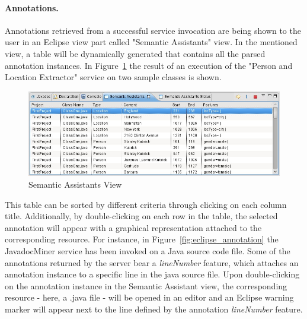 \paragraph{Annotations.}
Annotations retrieved from a successful service invocation are being shown to the user in an
Eclipse view part called "Semantic Assistants" view. In the mentioned view, a
table will be dynamically generated that contains
all the parsed annotation instances. In Figure~\ref{fig:eclipse_saView} the
result of an execution of the "Person and Location Extractor" service on two
sample classes is shown.
\begin{figure}[htb]
\begin{center}
  \includegraphics[width=1\textwidth]{pictures/eclipse_saView.jpg}
  \caption{Semantic Assistants View}
  \label{fig:eclipse_saView}
\end{center}
\end{figure}

This table can be sorted by different criteria through clicking on each column
title. Additionally, by double-clicking on each row in the table, the selected
annotation will appear with a graphical representation attached to the
corresponding resource. For instance, in Figure~\ref{fig:eclipse_annotation} the
JavadocMiner service has been invoked on a Java source code file. Some of the
annotations returned by the server bear a \emph{lineNumber} feature, which
attaches an annotation instance to a specific line in the java source file. Upon
double-clicking on the annotation instance in the Semantic Assistant view, the
corresponding resource - here, a .java file - will be opened in an editor and an
Eclipse warning marker will appear next to the line defined by the annotation
\emph{lineNumber} feature.

